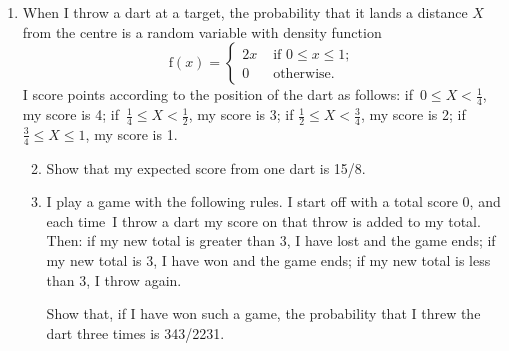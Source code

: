 \documentclass[a4, 11pt]{report}
\newlength{\qspace}
\newcounter{qnumber}
\newenvironment{question}%
 {\vspace{\qspace}
  \begin{enumerate}[\bfseries 1\quad][10]%
    \setcounter{enumi}{\value{qnumber}}%
    \item%
 }
{
  \end{enumerate}
  \filbreak
  \stepcounter{qnumber}
 }
\newenvironment{questionparts}[1][1]%
 {
  \begin{enumerate}[\bfseries (i)]%
    \setcounter{enumii}{#1}
    \addtocounter{enumii}{-1}
    \setlength{\itemsep}{5mm}
    \setlength{\parskip}{8pt}
 }
 {
  \end{enumerate}
 }
\def\le{\leqslant}
\begin{document}
\begin{question}
When I throw a dart at a target, the probability that it lands a 
distance $X$ from the centre is a random variable with density
function
\[
\mathrm{f}(x)=\begin{cases}
2x & \text{ if }0\leqslant x\leqslant1;\\
0 & \text{ otherwise.}
\end{cases}
\]
I score points according to the position of the dart as follows:
if~$0\le X< \frac14$, my score is 4;  
if~$\frac14\le X< \frac12$, my score is  3;
if $\frac12\le X< \frac34$, my score is  2;
if $\frac34\le X\le 1$, my score is  1. 

\begin{questionparts}
\item Show that my expected score from one dart is 15/8.
\item I play a game with the following rules. 
I start off with a total score 0, and each time~I throw a dart
my score on that throw is added to my total. Then:
\newline
\hspace*{10mm} 
if my new total is greater than 3, I have lost and the game ends;
\newline
\hspace*{10mm} if my new total is 3, I have won and the game ends;
\newline
\hspace*{10mm} if my new total is less than 3, I throw again.

 Show that, if I
have won such a game, the probability that I threw the dart three
times is 343/2231.
\end{questionparts}
\end{question}
	
\end{document}
